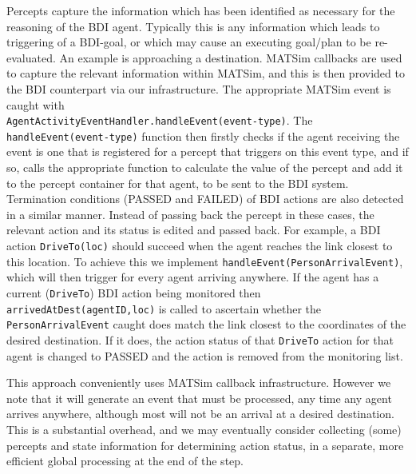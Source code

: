 Percepts capture the information which has been identified as
necessary for the reasoning of the BDI agent. Typically this is any
information which leads to triggering of a BDI-goal, or which may
cause an executing goal/plan to be re-evaluated. An example is
approaching a destination. MATSim callbacks are used to capture the relevant
information within MATSim, and this is then provided to the BDI
counterpart via our infrastructure. The appropriate MATSim event is
caught with
\\ \texttt{AgentActivityEventHandler.handleEvent(event-type)}.  The
\texttt{handleEvent(event-type)} function then firstly checks if the
agent receiving the event is one that is registered for a percept that
triggers on this event type, and if so, calls the appropriate function
to calculate the value of the percept and add it to the percept
container for that agent, to be sent to the BDI system. Termination
conditions (PASSED and FAILED) of BDI actions are also detected in a similar
manner.
Instead of passing back the percept in these cases, the relevant
action and its status is edited and passed back.  For example, a BDI
action \texttt{DriveTo(loc)} should succeed when the agent reaches the
link closest to this location. To achieve this we implement 
\texttt{handleEvent(PersonArrivalEvent)}, which will then trigger for every
agent arriving anywhere. If the agent has a current (\texttt{DriveTo})
BDI action being monitored then \texttt{arrivedAtDest(agentID,loc)} is
called to ascertain whether the \texttt{PersonArrivalEvent} caught
does match the link closest to the coordinates of the desired
destination. If it does, the action status of that \texttt{DriveTo} action for
that agent is changed to PASSED and the action is removed from the monitoring
list.

This approach conveniently uses MATSim callback
infrastructure. However we note that it will generate an event that
must be processed, any time any agent arrives anywhere, although most
will not be an arrival at a desired destination. This is a
substantial overhead, and we may eventually consider collecting (some)
percepts and state information for determining action status, in a
separate, more efficient global processing at the end of the step.

